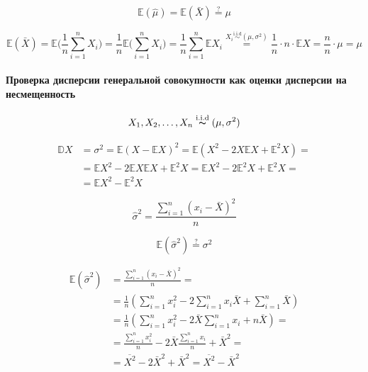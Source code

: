 \documentclass[
  letterpaper,
  DIV=11,
  numbers=noendperiod]{scrreprt}
\let\oldparagraph\paragraph
\renewcommand{\paragraph}[1]{\oldparagraph{#1}\mbox{}}
\theoremstyle{definition}
\theoremstyle{remark}
\begin{document}
\[
\mathbb{E}(\hat \mu) = \mathbb{E}(\bar X) \overset{?}{=} \mu
\]

\[
\mathbb{E}(\bar X) = \mathbb{E}\big (\frac{1}{n} \sum_{i=1}^n X_i \big ) = \frac{1}{n} \mathbb{E}\Big( \sum_{i=1}^n X_i \Big) = \frac{1}{n} \sum_{i=1}^n \mathbb{E}X_i \overset{X_i \overset{\text{i.i.d}}{\sim} (\mu, \sigma^2)}{=} \frac{1}{n} \cdot n \cdot \mathbb{E}X = \frac{n}{n} \cdot \mu = \mu
\]

\paragraph{Проверка дисперсии генеральной совокупности как оценки
дисперсии на
несмещенность}\label{ux43fux440ux43eux432ux435ux440ux43aux430-ux434ux438ux441ux43fux435ux440ux441ux438ux438-ux433ux435ux43dux435ux440ux430ux43bux44cux43dux43eux439-ux441ux43eux432ux43eux43aux443ux43fux43dux43eux441ux442ux438-ux43aux430ux43a-ux43eux446ux435ux43dux43aux438-ux434ux438ux441ux43fux435ux440ux441ux438ux438-ux43dux430-ux43dux435ux441ux43cux435ux449ux435ux43dux43dux43eux441ux442ux44c}

\[ 
X_1, X_2, \dots , X_n \overset{\text{i.i.d}}{\thicksim} (\mu, \sigma^2)
\]

\[
\begin{split}
\mathbb{D}X & = \sigma^2 = \mathbb{E}(X - \mathbb{E}X)^2 = \mathbb{E}(X^2 - 2 X \mathbb{E}X + \mathbb{E}^2 X) = \\
& = \mathbb{E}X^2 - 2\mathbb{E}X \mathbb{E}X + \mathbb{E}^2 X = \mathbb{E}X^2 - 2\mathbb{E}^2 X + \mathbb{E}^2 X = \\
& = \mathbb{E}X^2 - \mathbb{E}^2 X
\end{split}
\]

\[
\hat \sigma^2 = \frac{\sum_{i=1}^n (x_i - \bar X)^2}{n}
\]

\[
\mathbb{E}(\hat \sigma^2) \overset{?}{=} \sigma^2
\]

\[
\begin{split}
\mathbb{E}(\hat \sigma^2) & = \frac{\sum_{i=1}^n (x_i - \bar X)^2}{n} = \\
& = \frac{1}{n} \left(\sum_{i=1}^n x_i^2 - 2 \sum_{i=1}^n x_i \bar X  + \sum_{i=1}^n \bar X \right)\\ 
& = \frac{1}{n} \left(\sum_{i=1}^n x_i^2 - 2 \bar X \sum_{i=1}^n x_i + n \bar X \right)= \\
& = \frac{\sum_{i=1}^n x_i^2}{n} - 2 \bar X \frac{\sum_{i=1}^n x_i}{n} + \bar X^2 = \\
& = \overline{X^2} - 2 \bar X^2 + \bar X^2 = \overline{X^2} - \bar X^2
\end{split}
\]
\end{document}
